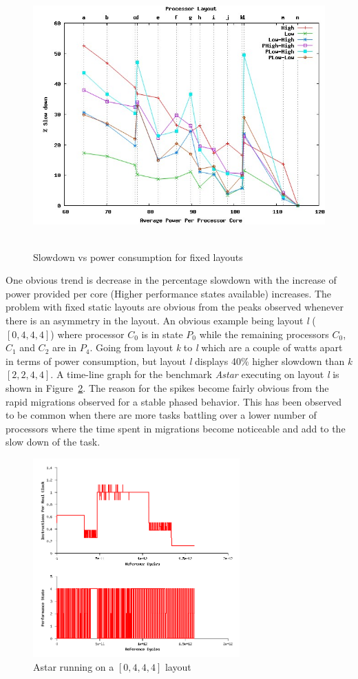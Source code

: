 \begin{figure}[h!]
  \begin{center}
    \includegraphics[height=4in]{figures/fixed_results.jpg}%
    \caption{Slowdown vs power consumption for fixed layouts}
    \label{fig:fixed_res}
  \end{center}
\end{figure}

One obvious trend is decrease in the percentage slowdown with the increase of power provided per 
core (Higher performance states available)
increases. The problem with fixed static layouts are obvious from the peaks observed
whenever there is an asymmetry in the layout. An obvious example being layout \textit{l} ($[0,4,4,4]$) where processor
$C_0$ is in state $P_0$ while the remaining processors $C_0$,$C_1$ and $C_2$ are in
$P_4$. Going from layout \textit{k} to \textit{l} which are a couple of watts apart in terms of power consumption,
but layout \textit{l} displays 40\% higher slowdown than \textit{k} $[2,2,4,4]$. 
A time-line graph for the benchmark \textit{Astar} executing on layout \textit{l} is shown in Figure~\ref{fig:fight_to_death}.
The reason for the spikes become fairly obvious from the rapid migrations observed for
a stable phased behavior. This has been observed to be common when there are more tasks battling
over a lower number of processors where the time spent in migrations
become noticeable and add to the slow down of the task. 

\begin{figure}[h!]
  \begin{center}
    \includegraphics[height=3in]{figures/astar_fight.png}%
    \caption{Astar running on a $[0,4,4,4]$ layout}
    \label{fig:fight_to_death}
  \end{center}
\end{figure}
